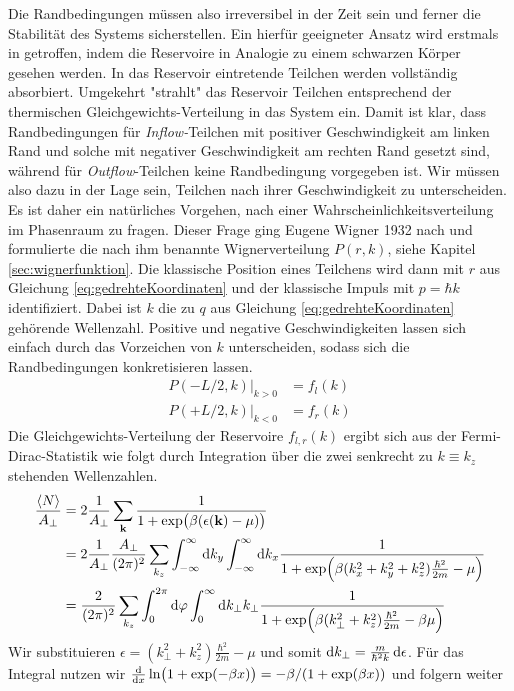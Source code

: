 Die Randbedingungen müssen also irreversibel in der Zeit sein und ferner die Stabilität des Systems sicherstellen. Ein hierfür geeigneter Ansatz wird erstmals in \cite{frensley2} getroffen, indem die Reservoire in Analogie zu einem schwarzen Körper gesehen werden. In das Reservoir eintretende Teilchen werden vollständig absorbiert. Umgekehrt "strahlt" das Reservoir Teilchen entsprechend der thermischen Gleichgewichts-Verteilung in das System ein. Damit ist klar, dass Randbedingungen für \emph{Inflow-}Teilchen mit positiver Geschwindigkeit am linken Rand und solche mit negativer Geschwindigkeit am rechten Rand gesetzt sind, während für \emph{Outflow}-Teilchen keine Randbedingung vorgegeben ist. Wir müssen also dazu in der Lage sein, Teilchen nach ihrer Geschwindigkeit zu unterscheiden.
Es ist daher ein natürliches Vorgehen, nach einer Wahrscheinlichkeitsverteilung im Phasenraum zu fragen. Dieser Frage ging Eugene Wigner 1932 nach \cite{wigner} und formulierte die nach ihm benannte Wignerverteilung $P(r, k)$, siehe Kapitel \ref{sec:wignerfunktion}. Die klassische Position eines Teilchens wird dann mit $r$ aus Gleichung \eqref{eq:gedrehteKoordinaten} und der klassische Impuls mit $p=\hbar k$ identifiziert.
Dabei ist $k$ die zu $q$ aus Gleichung \eqref{eq:gedrehteKoordinaten} gehörende Wellenzahl. Positive und negative Geschwindigkeiten lassen sich einfach durch das Vorzeichen von $k$ unterscheiden, sodass sich die Randbedingungen konkretisieren lassen.
\begin{align}
  P(-L/2,k)|_{k>0} &= f_l(k) \\
  P(+L/2,k)|_{k<0} &= f_r(k)
\end{align}
Die Gleichgewichts-Verteilung der Reservoire $f_{l,r}(k)$ ergibt sich aus der Fermi-Dirac-Statistik wie folgt durch Integration über die zwei senkrecht zu $k\equiv k_z$ stehenden Wellenzahlen.
\begin{align}
  \frac{\expval{N}}{A_{\perp}} &= 2\frac{1}{A_{\perp}}\sum_{\vb{k}}\frac{1}{1+\exp(\beta(\epsilon(\vb{k}) - \mu))} \\
    &= 2\frac{1}{A_{\perp}}  \frac{A_{\perp}}{(2\pi)^2} \sum_{k_z}\int_{-\infty}^{\infty} \mathop{}\!\mathrm{d} k_y \int_{-\infty}^{\infty} \mathop{}\!\mathrm{d} k_x \frac{1}{1+\exp(\beta(k_x^2 + k_y^2 + k_z^2)\frac{\hbar^2}{2m} - \mu)} \\
    &= \frac{2}{(2\pi)^2} \sum_{k_z} \int_0^{2\pi} \mathop{}\!\mathrm{d} \varphi \int_0^{\infty} \mathop{}\!\mathrm{d} k_{\perp} k_{\perp} \frac{1}{1+\exp(\beta(k_{\perp}^2 + k_z^2)\frac{\hbar^2}{2m} - \beta \mu)}
\end{align}
Wir substituieren $\epsilon = (k^2_{\perp} + k_z^2)\frac{\hbar^2}{2m} - \mu$ und somit $\mathop{}\!\mathrm{d} k_\perp = \frac{m}{\hbar^2 k}\mathop{}\!\mathrm{d} \epsilon$. Für das Integral nutzen wir $\frac{\mathrm{d}}{\mathrm{d}x}\ln(1+\exp(-\beta x)) = -\beta / (1+\exp(\beta x))$ und folgern weiter
